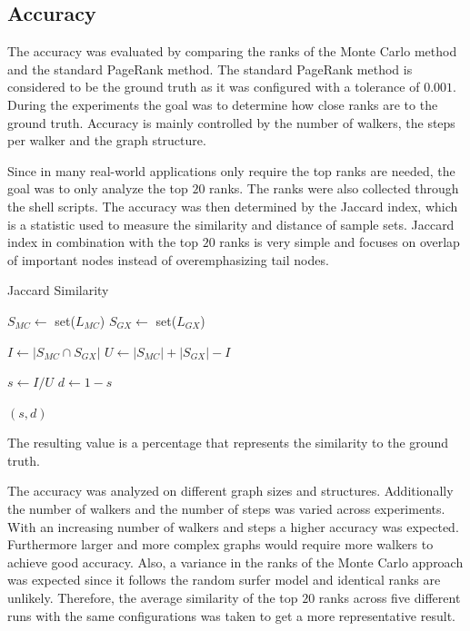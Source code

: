 \subsection{Accuracy}
The accuracy was evaluated by comparing the ranks of the Monte Carlo method and the standard PageRank method. The standard PageRank method is considered to be the ground truth as it was configured with a tolerance of $0.001$. During the experiments the goal was to determine how close ranks are to the ground truth. Accuracy is mainly controlled by the number of walkers, the steps per walker and the graph structure. \par

Since in many real-world applications only require the top ranks are needed, the goal was to only analyze the top $20$ ranks. The ranks were also collected through the shell scripts. The accuracy was then determined by the Jaccard index, which is a statistic used to measure the similarity and distance of sample sets. Jaccard index in combination with the top $20$ ranks is very simple and focuses on overlap of important nodes instead of overemphasizing tail nodes.

\vspace{1.0em}
\begin{algorithm}[H]
\caption{Jaccard Similarity}

$S_{MC} \gets$ set($L_{MC}$) \;
$S_{GX} \gets$ set($L_{GX}$) \;

$I \gets |S_{MC} \cap S_{GX}|$ \;  
$U \gets |S_{MC}| + |S_{GX}| - I$ \; 

$s \gets I / U$ \;
$d \gets 1 - s$ \;

\Return $(s, d)$ \;
\end{algorithm}
\vspace{1.0em}

The resulting value is a percentage that represents the similarity to the ground truth. \par

The accuracy was analyzed on different graph sizes and structures. Additionally the number of walkers and the number of steps was varied across experiments. With an increasing number of walkers and steps a higher accuracy was expected. Furthermore larger and more complex graphs would require more walkers to achieve good accuracy. Also, a variance in the ranks of the Monte Carlo approach was expected since it follows the random surfer model and identical ranks are unlikely. Therefore, the average similarity of the top $20$ ranks across five different runs with the same configurations was taken to get a more representative result.


